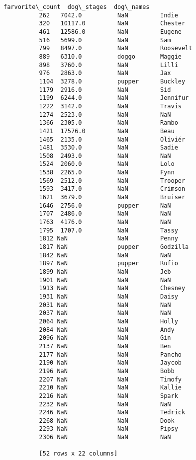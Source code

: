 \documentclass[11pt]{article}
\begin{document}
\begin{Verbatim}[commandchars=\\\{\}]
               farvorite\_count  dog\_stages  dog\_names  
          262   7042.0          NaN         Indie      
          320   10117.0         NaN         Chester    
          461   12586.0         NaN         Eugene     
          516   5699.0          NaN         Sam        
          799   8497.0          NaN         Roosevelt  
          889   6310.0          doggo       Maggie     
          898   3760.0          NaN         Lilli      
          976   2863.0          NaN         Jax        
          1104  3278.0          pupper      Buckley    
          1179  2916.0          NaN         Sid        
          1199  6244.0          NaN         Jennifur   
          1222  3142.0          NaN         Travis     
          1274  2523.0          NaN         NaN        
          1366  2305.0          NaN         Rambo      
          1421  17576.0         NaN         Beau       
          1465  2135.0          NaN         Oliviér    
          1481  3530.0          NaN         Sadie      
          1508  2493.0          NaN         NaN        
          1524  2060.0          NaN         Lolo       
          1538  2265.0          NaN         Fynn       
          1569  2512.0          NaN         Trooper    
          1593  3417.0          NaN         Crimson    
          1621  3679.0          NaN         Bruiser    
          1646  2756.0          pupper      NaN        
          1707  2486.0          NaN         NaN        
          1763  4176.0          NaN         NaN        
          1795  1707.0          NaN         Tassy      
          1812 NaN              NaN         Penny      
          1817 NaN              pupper      Godzilla   
          1842 NaN              NaN         NaN        
          1897 NaN              pupper      Rufio      
          1899 NaN              NaN         Jeb        
          1901 NaN              NaN         NaN        
          1913 NaN              NaN         Chesney    
          1931 NaN              NaN         Daisy      
          2031 NaN              NaN         NaN        
          2037 NaN              NaN         NaN        
          2064 NaN              NaN         Holly      
          2084 NaN              NaN         Andy       
          2096 NaN              NaN         Gin        
          2137 NaN              NaN         Ben        
          2177 NaN              NaN         Pancho     
          2190 NaN              NaN         Jaycob     
          2196 NaN              NaN         Bobb       
          2207 NaN              NaN         Timofy     
          2210 NaN              NaN         Kallie     
          2216 NaN              NaN         Spark      
          2232 NaN              NaN         NaN        
          2246 NaN              NaN         Tedrick    
          2268 NaN              NaN         Dook       
          2293 NaN              NaN         Pipsy      
          2306 NaN              NaN         NaN        
          
          [52 rows x 22 columns]
\end{Verbatim}
            
\end{document}

